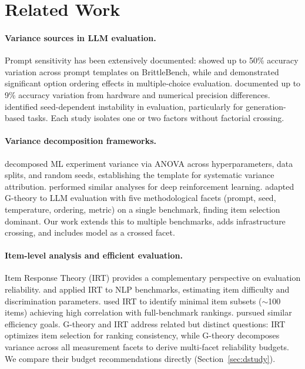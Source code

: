 \documentclass[letterpaper,11pt]{article}
\begin{document}
\section{Related Work}

\paragraph{Variance sources in LLM evaluation.}
Prompt sensitivity has been extensively documented: \citet{mizrahi2024state} showed up to 50\% accuracy variation across prompt templates on BrittleBench, while \citet{lu2022fantastically} and \citet{pezeshkpour2024largelanguagemodelsensitivity} demonstrated significant option ordering effects in multiple-choice evaluation.
\citet{yuan2025precisionpitfalls} documented up to 9\% accuracy variation from hardware and numerical precision differences.
\citet{biderman2024lessons} identified seed-dependent instability in evaluation, particularly for generation-based tasks.
Each study isolates one or two factors without factorial crossing.

\paragraph{Variance decomposition frameworks.}
\citet{bouthillier2021accounting} decomposed ML experiment variance via ANOVA across hyperparameters, data splits, and random seeds, establishing the template for systematic variance attribution.
\citet{henderson2018deep} performed similar analyses for deep reinforcement learning.
\citet{mesting2026gtheory} adapted G-theory to LLM evaluation with five methodological facets (prompt, seed, temperature, ordering, metric) on a single benchmark, finding item selection dominant.
Our work extends this to multiple benchmarks, adds infrastructure crossing, and includes model as a crossed facet.

\paragraph{Item-level analysis and efficient evaluation.}
Item Response Theory (IRT) provides a complementary perspective on evaluation reliability.
\citet{lalor2019learning} and \citet{rodriguez2021evaluation} applied IRT to NLP benchmarks, estimating item difficulty and discrimination parameters.
\citet{polo2024tinybenchmarks} used IRT to identify minimal item subsets ($\sim$100 items) achieving high correlation with full-benchmark rankings.
\citet{perlitz2023efficient} pursued similar efficiency goals.
G-theory and IRT address related but distinct questions: IRT optimizes item selection for ranking consistency, while G-theory decomposes variance across all measurement facets to derive multi-facet reliability budgets.
We compare their budget recommendations directly (Section~\ref{sec:dstudy}).
\end{document}
